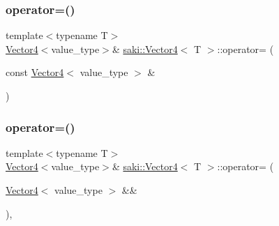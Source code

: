 \mbox{\label{classsaki_1_1_vector4_a41f953f5fc1eee1909a773ca7a1ed647}} 
\subsubsection{\texorpdfstring{operator=()}{operator=()}\hspace{0.1cm}{\footnotesize\ttfamily [1/2]}}
{\footnotesize\ttfamily template$<$typename T$>$ \\
\mbox{\hyperlink{classsaki_1_1_vector4}{Vector4}}$<$value\+\_\+type$>$\& \mbox{\hyperlink{classsaki_1_1_vector4}{saki\+::\+Vector4}}$<$ T $>$\+::operator= (\begin{DoxyParamCaption}\item[{const \mbox{\hyperlink{classsaki_1_1_vector4}{Vector4}}$<$ value\+\_\+type $>$ \&}]{ }\end{DoxyParamCaption})\hspace{0.3cm}{\ttfamily [default]}}

\mbox{\label{classsaki_1_1_vector4_a6db19f1cf96ebc366014f6bec2b7801c}} 
\subsubsection{\texorpdfstring{operator=()}{operator=()}\hspace{0.1cm}{\footnotesize\ttfamily [2/2]}}
{\footnotesize\ttfamily template$<$typename T$>$ \\
\mbox{\hyperlink{classsaki_1_1_vector4}{Vector4}}$<$value\+\_\+type$>$\& \mbox{\hyperlink{classsaki_1_1_vector4}{saki\+::\+Vector4}}$<$ T $>$\+::operator= (\begin{DoxyParamCaption}\item[{\mbox{\hyperlink{classsaki_1_1_vector4}{Vector4}}$<$ value\+\_\+type $>$ \&\&}]{ }\end{DoxyParamCaption})\hspace{0.3cm}{\ttfamily [default]}, {\ttfamily [noexcept]}}

\mbox{\label{classsaki_1_1_vector4_a7e5a60c77b2f5c2572fd106d8a0e1648}} 
